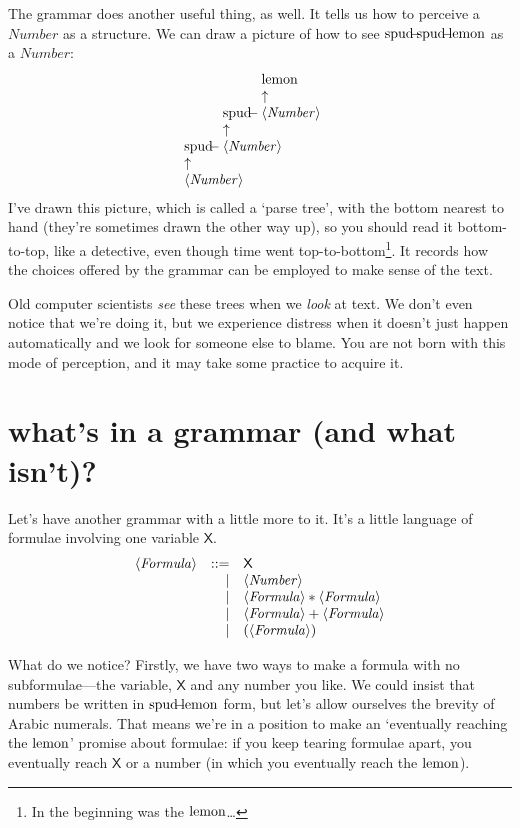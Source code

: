 \documentclass{book}
\begin{document}
\newcommand{\nta}[2]{\begin{array}[b]{l} #2\\ \uparrow\\ \nt{#1}\end{array}}
The grammar does another useful thing, as well. It tells us how to perceive a $\mathit{Number}$ as a structure. We can draw a picture of how to see $\spud\spud\lemon$ as a $\mathit{Number}$:
\[\nta{Number}{\spud\nta{Number}{\spud\nta{Number}{\lemon}}}\]
I've drawn this picture, which is called a `parse tree', with the bottom nearest to hand (they're sometimes drawn the other way up), so you should read it bottom-to-top, like a detective, even though time went top-to-bottom\footnote{In the beginning was the $\mbox{lemon}$\ldots}. It records how the choices offered by the grammar can be employed to make sense of the text.

Old computer scientists \emph{see} these trees when we \emph{look} at text. We don't even notice that we're doing it, but we experience distress when it doesn't just happen automatically and we look for someone else to blame. You are not born with this mode of perception, and it may take some practice to acquire it.


\section{what's in a grammar (and what isn't)?}

\newcommand{\X}{\mathsf{X}}
\newcommand{\SB}{\mathsf{SumBelow}\;}
\newcommand{\SH}{\mathsf{Shift}\;}
Let's have another grammar with a little more to it. It's a little language of formulae involving one variable $\X$.
\[\begin{array}{rrl}
\nt{Formula}
& ::= & \X \\
&   | & \nt{Number} \\
&   | & \nt{Formula} * \nt{Formula} \\
&   | & \nt{Formula} + \nt{Formula} \\
&   | & (\nt{Formula})
\end{array}\]

What do we notice? Firstly, we have two ways to make a formula with no subformulae---the variable, $\X$ and any number you like. We could insist that numbers be written in $\mbox{spud}\!\!\!-\!\!\!\mbox{lemon}$ form, but let's allow ourselves the brevity of Arabic numerals. That means we're in a position to make an `eventually reaching the $\mbox{lemon}$' promise about formulae: if you keep tearing formulae apart, you eventually reach $\X$ or a number (in which you eventually reach the $\mbox{lemon}$).
\end{document}
